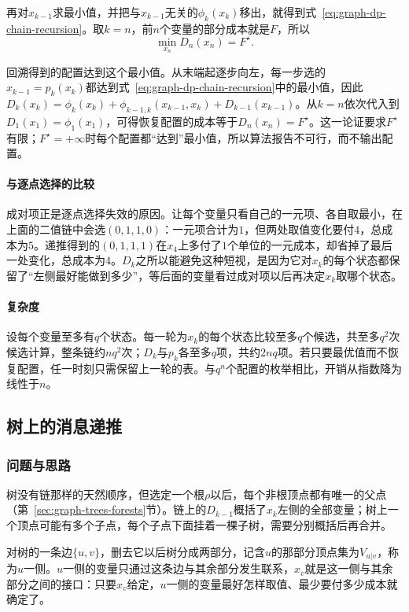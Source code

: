 再对$x_{k-1}$求最小值，并把与$x_{k-1}$无关的$\phi_k(x_k)$移出，就得到式~\eqref{eq:graph-dp-chain-recursion}。取$k=n$，前$n$个变量的部分成本就是$F$，所以
\[
\min_{x_n}D_n(x_n)=F^\star.
\]

回溯得到的配置达到这个最小值。从末端起逐步向左，每一步选的$x_{k-1}=p_k(x_k)$都达到式~\eqref{eq:graph-dp-chain-recursion}中的最小值，因此$D_k(x_k)=\phi_k(x_k)+\phi_{k-1,k}(x_{k-1},x_k)+D_{k-1}(x_{k-1})$。从$k=n$依次代入到$D_1(x_1)=\phi_1(x_1)$，可得恢复配置的成本等于$D_n(x_n)=F^\star$。这一论证要求$F^\star$有限；$F^\star=+\infty$时每个配置都“达到”最小值，所以算法报告不可行，而不输出配置。

\paragraph{与逐点选择的比较}
成对项正是逐点选择失效的原因。让每个变量只看自己的一元项、各自取最小，在上面的二值链中会选$(0,1,1,0)$：一元项合计为$1$，但两处取值变化要付$4$，总成本为$5$。递推得到的$(0,1,1,1)$在$x_4$上多付了$1$个单位的一元成本，却省掉了最后一处变化，总成本为$4$。$D_k$之所以能避免这种短视，是因为它对$x_k$的每个状态都保留了“左侧最好能做到多少”，等后面的变量看过成对项以后再决定$x_k$取哪个状态。

\paragraph{复杂度}
设每个变量至多有$q$个状态。每一轮为$x_k$的每个状态比较至多$q$个候选，共至多$q^2$次候选计算，整条链约$nq^2$次；$D_k$与$p_k$各至多$q$项，共约$2nq$项。若只要最优值而不恢复配置，任一时刻只需保留上一轮的表。与$q^n$个配置的枚举相比，开销从指数降为线性于$n$。

\subsection{树上的消息递推}
\label{sec:graph-dp-tree-messages}

\subsubsection{问题与思路}

树没有链那样的天然顺序，但选定一个根$\rho$以后，每个非根顶点都有唯一的父点（第~\ref{sec:graph-trees-forests}节）。链上的$D_{k-1}$概括了$x_k$左侧的全部变量；树上一个顶点可能有多个子点，每个子点下面挂着一棵子树，需要分别概括后再合并。

对树的一条边$\{u,v\}$，删去它以后树分成两部分，记含$u$的那部分顶点集为$V_{u|v}$，称为$u$一侧。$u$一侧的变量只通过这条边与其余部分发生联系，$x_v$就是这一侧与其余部分之间的接口：只要$x_v$给定，$u$一侧的变量最好怎样取值、最少要付多少成本就确定了。

